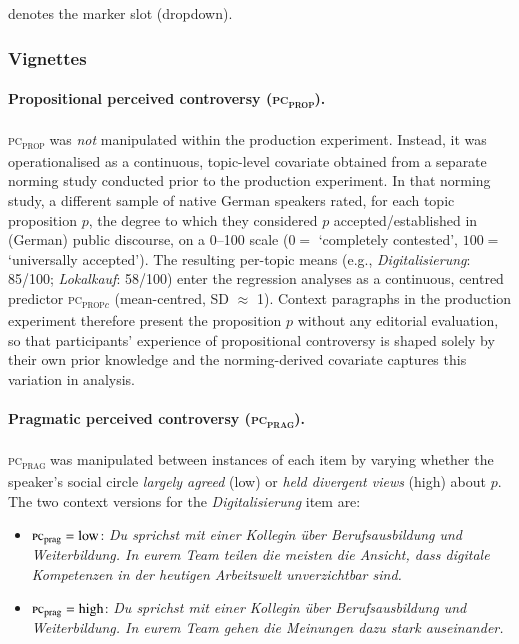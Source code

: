 \documentclass[12pt]{article}
\begin{document}
\noindent [M] denotes the marker slot (dropdown).

\subsubsection{Vignettes}

\paragraph{Propositional perceived controversy (\textsc{pc\textsubscript{prop}}).}
\textsc{pc\textsubscript{prop}} was \emph{not} manipulated within the
production experiment.
Instead, it was operationalised as a continuous, topic-level covariate
obtained from a separate norming study conducted prior to the production
experiment.
In that norming study, a different sample of native German speakers rated,
for each topic proposition $p$, the degree to which they considered $p$
accepted/established in (German) public discourse, on a 0--100 scale
($0 = $ `completely contested', $100 = $ `universally accepted').
The resulting per-topic means (e.g., \textit{Digitalisierung}: 85/100;
\textit{Lokalkauf}: 58/100) enter the regression analyses as a
continuous, centred predictor \textsc{pc\textsubscript{prop}}$_c$
(mean-centred, SD $\approx$ 1).
Context paragraphs in the production experiment therefore present
the proposition $p$ without any editorial evaluation, so that
participants' experience of propositional controversy is shaped
solely by their own prior knowledge and the norming-derived covariate
captures this variation in analysis.

\paragraph{Pragmatic perceived controversy (\textsc{pc\textsubscript{prag}}).}
\textsc{pc\textsubscript{prag}} was manipulated between instances of each item
by varying whether the speaker's social circle \emph{largely agreed} (low)
or \emph{held divergent views} (high) about $p$.
The two context versions for the \textit{Digitalisierung} item are:

\begin{itemize}
  \item $\textsc{pc}_\text{prag} = \text{low}$: \textit{Du sprichst mit einer
        Kollegin {\"u}ber Berufsausbildung und Weiterbildung.
        In eurem Team teilen die meisten die Ansicht,
        dass digitale Kompetenzen in der heutigen Arbeitswelt unverzichtbar sind.}
  \item $\textsc{pc}_\text{prag} = \text{high}$: \textit{Du sprichst mit einer
        Kollegin {\"u}ber Berufsausbildung und Weiterbildung.
        In eurem Team gehen die Meinungen dazu stark auseinander.}
\end{itemize}
\end{document}
